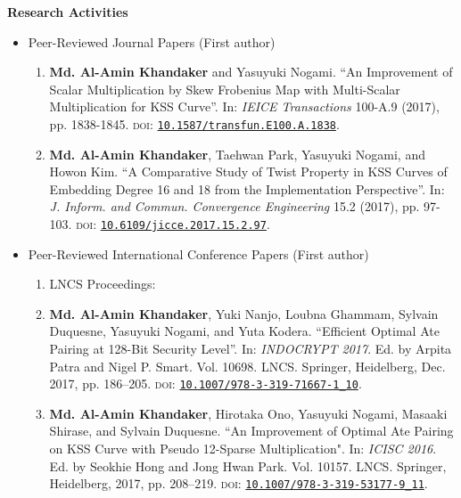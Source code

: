 \newpage
\pagestyle{plain}
\textbf{\huge Research Activities}\label{research_activity}
\vspace{10mm}\\
\begin{itemize}
\Large
\item Peer-Reviewed Journal Papers  (First author)
\normalsize
\begin{enumerate}
	\item \textbf{Md. Al-Amin Khandaker} and Yasuyuki Nogami. “An Improvement of Scalar Multiplication by Skew Frobenius Map with Multi-Scalar Multiplication for KSS Curve”. In: \textit{IEICE Transactions} 100-A.9 (2017), pp. 1838-1845. \textsc{doi}: \href{https://doi.org/10.1587/transfun.E100.A.1838}{\texttt{10.1587/transfun.E100.A.1838}}.

	\normalsize
	\item\textbf{Md. Al-Amin Khandaker}, Taehwan Park, Yasuyuki Nogami, and Howon Kim. “A Comparative Study of Twist Property in KSS Curves of Embedding Degree 16 and 18 from the Implementation Perspective”. In: \textit{J. Inform. and Commun. Convergence Engineering} 15.2 (2017),  pp. 97-103. \textsc{doi}: \href{https://doi.org/10.6109/jicce.2017.15.2.97}{\texttt{10.6109/jicce.2017.15.2.97}}.
\end{enumerate}
\normalsize
\vspace{10mm}
\Large
\item Peer-Reviewed International Conference Papers  (First author)
\normalsize
\begin{enumerate}
	\item[ ] \Large LNCS Proceedings:
	\normalsize
	\item \textbf{Md. Al-Amin Khandaker}, Yuki Nanjo, Loubna Ghammam, Sylvain Duquesne, Yasuyuki Nogami, and Yuta Kodera. “Efficient Optimal Ate Pairing at 128-Bit Security Level”. In: \textit{INDOCRYPT 2017}. Ed. by Arpita Patra
	and Nigel P. Smart. Vol. 10698. LNCS. Springer, Heidelberg, Dec. 2017, pp. 186–205. \textsc{doi}: \href{https://doi.org/10.1007/978-3-319-71667-1_10}{\texttt{10.1007/978-3-319-71667-1\_10}}.
	
	\item \textbf{Md. Al-Amin Khandaker}, Hirotaka Ono, Yasuyuki Nogami, Masaaki Shirase, and Sylvain Duquesne. ``An Improvement of Optimal Ate Pairing
	on KSS Curve with Pseudo 12-Sparse Multiplication". In: \textit{ICISC 2016}. Ed. by Seokhie Hong and Jong Hwan Park. Vol. 10157. LNCS. Springer, Heidelberg, 2017, pp. 208–219. \textsc{doi}: \href{https://doi.org/10.1007/978-3-319-53177-9_11}{\texttt{10.1007/978-3-319-53177-9\_11}}.
	

\end{enumerate}
\end{itemize}
